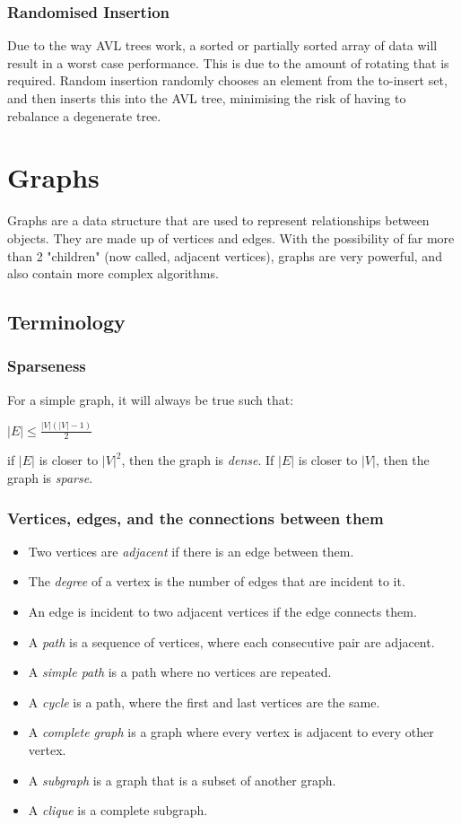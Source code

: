 \documentclass[14]{article}
\begin{document}
\subsubsection{Randomised Insertion}
Due to the way AVL trees work, a sorted or partially sorted array of data will result in a worst case performance.
This is due to the amount of rotating that is required. Random insertion randomly chooses an element from the to-insert 
set, and then inserts this into the AVL tree, minimising the risk of having to rebalance a degenerate tree.
\pagebreak
\section{Graphs}
Graphs are a data structure that are used to represent relationships between objects. They are made up of vertices and edges.
With the possibility of far more than 2 "children" (now called, adjacent vertices), graphs are very powerful, and also
contain more complex algorithms.  
\subsection{Terminology}
\subsubsection{Sparseness}
For a simple graph, it will always be true such that:
\begin{center}
    $|E| \leq \frac{|V|(|V| - 1)}{2}$
\end{center}
if $|E|$ is closer to $|V|^2$, then the graph is \emph{dense}. If $|E|$ is closer to $|V|$, then the graph is \emph{sparse}.
\subsubsection{Vertices, edges, and the connections between them}
\begin{itemize}
    \item Two vertices are \emph{adjacent} if there is an edge between them.  
    \item The \emph{degree} of a vertex is the number of edges that are incident to it. 
    \item An edge is incident to two adjacent vertices if the edge connects them.
    \item A \emph{path} is a sequence of vertices, where each consecutive pair are adjacent.
    \item A \emph{simple path} is a path where no vertices are repeated.
    \item A \emph{cycle} is a path, where the first and last vertices are the same.
    \item A \emph{complete graph} is a graph where every vertex is adjacent to every other vertex.
    \item A \emph{subgraph} is a graph that is a subset of another graph.
    \item A \emph{clique} is a complete subgraph.
\end{itemize}
\end{document}

